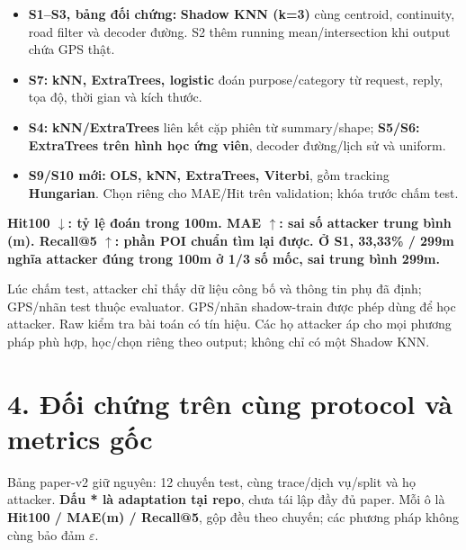 \documentclass[11pt,a4paper]{article}
\newcommand{\key}[1]{\par\smallskip\noindent\colorbox{pale}{\parbox{\dimexpr\linewidth-2\fboxsep}{\textbf{#1}}}\par\smallskip}
\begin{document}
\begin{itemize}
\item \textbf{S1–S3, bảng đối chứng:} \textbf{Shadow KNN (k=3)} cùng centroid, continuity, road filter và decoder đường. S2 thêm running mean/intersection khi output chứa GPS thật.
\item \textbf{S7:} \textbf{kNN, ExtraTrees, logistic} đoán purpose/category từ request, reply, tọa độ, thời gian và kích thước.
\item \textbf{S4:} \textbf{kNN/ExtraTrees} liên kết cặp phiên từ summary/shape; \textbf{S5/S6:} \textbf{ExtraTrees trên hình học ứng viên}, decoder đường/lịch sử và uniform.
\item \textbf{S9/S10 mới:} \textbf{OLS, kNN, ExtraTrees, Viterbi}, gồm tracking \textbf{Hungarian}. Chọn riêng cho MAE/Hit trên validation; khóa trước chấm test.
\end{itemize}
\key{Hit100 $\downarrow$: tỷ lệ đoán trong 100m. MAE $\uparrow$: sai số attacker trung bình (m). Recall@5 $\uparrow$: phần POI chuẩn tìm lại được. Ở S1, 33,33\% / 299m nghĩa attacker đúng trong 100m ở 1/3 số mốc, sai trung bình 299m.}
Lúc chấm test, attacker chỉ thấy dữ liệu công bố và thông tin phụ đã định; GPS/nhãn test thuộc evaluator. GPS/nhãn shadow-train được phép dùng để học attacker. Raw kiểm tra bài toán có tín hiệu. Các họ attacker áp cho mọi phương pháp phù hợp, học/chọn riêng theo output; không chỉ có một Shadow KNN.

\clearpage
\section*{4. Đối chứng trên cùng protocol và metrics gốc}
Bảng paper-v2 giữ nguyên: 12 chuyến test, cùng trace/dịch vụ/split và họ attacker. \textbf{Dấu * là adaptation tại repo}, chưa tái lập đầy đủ paper. Mỗi ô là \textbf{Hit100 / MAE(m) / Recall@5}, gộp đều theo chuyến; các phương pháp không cùng bảo đảm $\varepsilon$.
\end{document}
